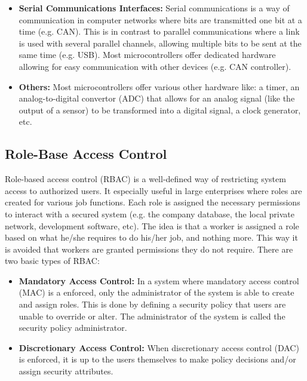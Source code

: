 \documentclass[master=cws,masteroption=vs,english]{kulemt}
\begin{document}
\begin{itemize}
	\item \textbf{Serial Communications Interfaces:} Serial communications is a way of communication in computer networks where bits are transmitted one bit at a time (e.g. CAN). This is in contrast to parallel communications where a link is used with several parallel channels, allowing multiple bits to be sent at the same time (e.g. USB). Most microcontrollers offer dedicated hardware allowing for easy communication with other devices (e.g. CAN controller).
	
	\item \textbf{Others:} Most microcontrollers offer various other hardware like: a timer, an analog-to-digital convertor (ADC) that allows for an analog signal (like the output of a sensor) to be transformed into a digital signal, a clock generator, etc.
\end{itemize}

\subsection{Role-Base Access Control}
\label{sec:RBAC}

Role-based access control (RBAC) is a well-defined way of restricting system access to authorized users. It especially useful in large enterprises where roles are created for various job functions. Each role is assigned the necessary permissions to interact with a secured system (e.g. the company database, the local private network, development software, etc). The idea is that a worker is assigned a role based on what he/she requires to do his/her job, and nothing more. This way it is avoided that workers are granted permissions they do not require. There are two basic types of RBAC\cite{wiki:RBAC}:

\begin{itemize}
	\item \textbf{Mandatory Access Control:} In a system where mandatory access control (MAC) is a enforced, only the administrator of the system is able to create and assign roles. This is done by defining a security policy that users are unable to override or alter. The administrator of the system is called the security policy administrator.
	
	\item \textbf{Discretionary Access Control:} When discretionary access control (DAC) is enforced, it is up to the users themselves to make policy decisions and/or assign security attributes.
\end{itemize}
\end{document}
